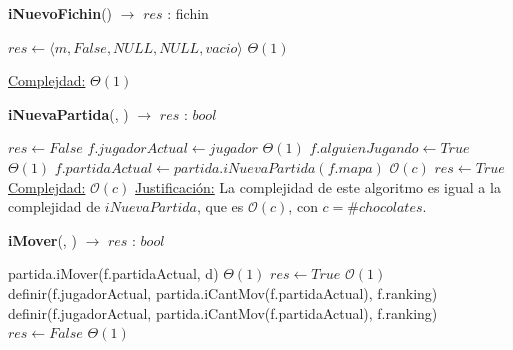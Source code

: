 \documentclass[10pt, a4paper]{article}
\newcommand{\bigO}{\mathcal{O}}
\begin{document}
        \begin{Algoritmos}

            \begin{algorithm}[H]{\textbf{iNuevoFichin}() $\to$ $res$ : fichin}
                    \begin{algorithmic}[1]
                            \State $res \gets \langle m, False, NULL, NULL, vacio \rangle$ \Comment $\Theta(1)$
            
                        \medskip
                        \Statex
                        \underline{Complejdad:} $\Theta(1)$
                    \end{algorithmic}
            \end{algorithm}
        
            \begin{algorithm}[H]{\textbf{iNuevaPartida}(, ) $\to$ $res$ : $bool$}
                \begin{algorithmic}
                        \State $res\gets False$
                            \State $f.jugadorActual \gets jugador$ 				\Comment $\Theta(1)$
                            \State $f.alguienJugando \gets True$ 				\Comment $\Theta(1)$
                            \State $f.partidaActual \gets partida.iNuevaPartida(f.mapa)$ 				\Comment $\bigO(c)$
                            \State $res\gets True$
                            \EndIf
                        \medskip
                        \Statex
                        \underline{Complejdad:} $\bigO(c)$
                        \Statex
                        \underline{Justificación:} La complejidad de este algoritmo es igual a la complejidad de $iNuevaPartida$, que es $\bigO(c)$, con $c = \#chocolates$. 
                    \end{algorithmic}
            \end{algorithm}

        \begin{algorithm}[H]{\textbf{iMover}(, ) $\to$ $res$ : $bool$}
            \begin{algorithmic}[1]
                    \State partida.iMover(f.partidaActual, d)	\Comment $\Theta(1)$
                    \State $res\gets True$
                    	\Comment $\bigO(1)$
                    \Comment{$\bigO(|J|)$}
                     \Comment{$\bigO(|J|)$} \\
                    \qquad\qquad definir(f.jugadorActual, partida.iCantMov(f.partidaActual), f.ranking)\Comment{$\bigO(|J|)$} \EndIf
                \Else\hspace{0.05cm} definir(f.jugadorActual, partida.iCantMov(f.partidaActual), f.ranking)\Comment{$\bigO(|J|)$}\EndIf
                    \EndIf
                    \Else
                    \State $res\gets False$	\Comment $\Theta(1)$
                \EndIf 


\end{algorithmic}
\end{algorithm}
\end{Algoritmos}
\end{document}
